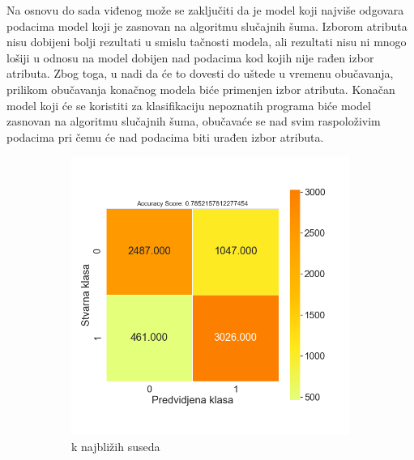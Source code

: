 \documentclass[12pt,oneside]{memoir}
\begin{document}
Na osnovu do sada viđenog može se zaključiti da je model koji najviše odgovara podacima model koji je zasnovan na algoritmu slučajnih šuma. Izborom atributa nisu dobijeni bolji rezultati u smislu tačnosti modela, ali rezultati nisu ni mnogo lošiji u odnosu na model dobijen nad podacima kod kojih nije rađen izbor atributa. Zbog toga, u nadi da će to dovesti do uštede u vremenu obučavanja, prilikom obučavanja konačnog modela biće primenjen izbor atributa. Konačan model koji će se koristiti za klasifikaciju nepoznatih programa biće model zasnovan na algoritmu slučajnih šuma, obučavaće se nad svim raspoloživim podacima pri čemu će nad podacima biti urađen izbor atributa.

\begin{figure}[!ht]
    \centering
    \begin{subfigure}[b]{0.45\textwidth}
        \centering
        \includegraphics[width=\textwidth]{KNN_feature_selection_oversampled_confussion_matrix}
        \caption{k najbližih suseda}
        \label{fig:knear4}
    \end{subfigure}
    \begin{subfigure}[b]{0.45\textwidth}
        \centering

\end{subfigure}
\end{figure}
\end{document}
